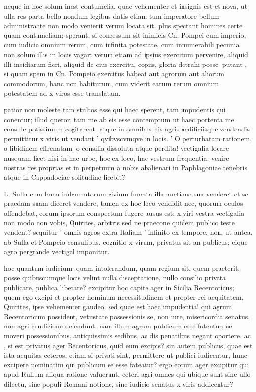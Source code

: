  neque in hoc solum inest contumelia, quae vehementer et insignis est et nova, ut ulla res parta bello nondum legibus datis etiam tum imperatore bellum administrante non modo venierit verum locata sit. plus spectant homines certe quam contumeliam; sperant, si concessum sit inimicis Cn. Pompei cum imperio, cum iudicio omnium rerum, cum infinita potestate, cum innumerabili pecunia non solum illis in locis vagari verum etiam ad ipsius exercitum pervenire, aliquid illi insidiarum fieri, aliquid de eius exercitu, copiis, gloria detrahi posse. putant , si quam spem in Cn. Pompeio exercitus habeat aut agrorum aut aliorum commodorum, hanc non habiturum, cum viderit earum rerum omnium potestatem ad x viros esse translatam.

 patior non moleste tam stultos esse qui haec sperent, tam impudentis qui conentur; illud queror, tam me ab eis esse contemptum ut haec portenta me consule potissimum cogitarent. atque in omnibus his agris aedificiisque vendendis permittitur x viris ut vendant ' qvibvscvmqve in locis. ' O perturbatam rationem, o libidinem effrenatam, o consilia dissoluta atque perdita! vectigalia locare nusquam licet nisi in hac urbe, hoc ex loco, hac vestrum frequentia. venire nostras res proprias et in perpetuum a nobis abalienari in Paphlagoniae tenebris atque in Cappadociae solitudine licebit?

 L. Sulla cum bona indemnatorum civium funesta illa auctione sua venderet et se praedam suam diceret vendere, tamen ex hoc loco vendidit nec, quorum oculos offendebat, eorum ipsorum conspectum fugere ausus est; x viri vestra vectigalia non modo non vobis, Quirites, arbitris sed ne praecone quidem publico teste vendent? sequitur ' omnis agros extra Italiam ' infinito ex tempore, non, ut antea, ab Sulla et Pompeio consulibus. cognitio x virum, privatus sit an publicus; eique agro pergrande vectigal imponitur.

 hoc quantum iudicium, quam intolerandum, quam regium sit, quem praeterit, posse quibuscumque locis velint nulla disceptatione, nullo consilio privata publicare, publica liberare? excipitur hoc capite ager in Sicilia Recentoricus; quem ego excipi et propter hominum necessitudinem et propter rei aequitatem, Quirites, ipse vehementer gaudeo. sed quae est haec impudentia! qui agrum Recentoricum possident, vetustate possessionis se, non iure, misericordia senatus, non agri condicione defendunt. nam illum agrum publicum esse fatentur; se moveri possessionibus, antiquissimis sedibus, ac dis penatibus negant oportere. ac , si est privatus ager Recentoricus, quid eum excipis? sin autem publicus, quae est ista aequitas ceteros, etiam si privati sint, permittere ut publici iudicentur, hunc excipere nominatim qui publicum se esse fateatur? ergo eorum ager excipitur qui apud Rullum aliqua ratione valuerunt, ceteri agri omnes qui ubique sunt sine ullo dilectu, sine populi Romani notione, sine iudicio senatus x viris addicentur?

